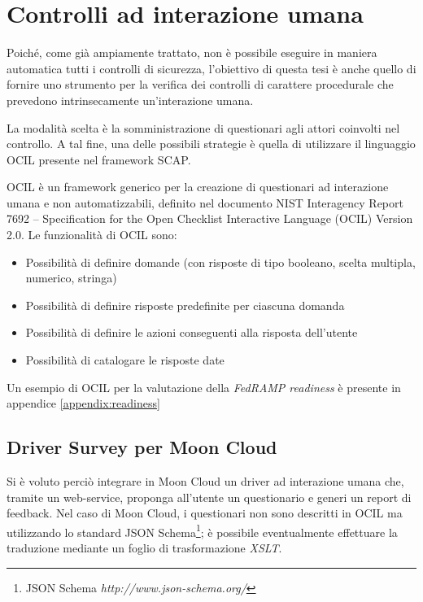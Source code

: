 \documentclass[../main.tex]{subfiles}
\begin{document}
\section{Controlli ad interazione umana}
Poiché, come già ampiamente trattato, non è possibile eseguire in maniera automatica tutti i controlli di sicurezza, l'obiettivo di questa tesi è
anche quello di fornire uno strumento per la verifica dei controlli di carattere procedurale che prevedono intrinsecamente un'interazione umana.

La modalità scelta è la somministrazione di questionari agli attori coinvolti nel controllo. A tal fine, una delle possibili strategie è quella di utilizzare
il linguaggio OCIL presente nel framework SCAP.

OCIL è un framework generico per la creazione di questionari ad interazione umana e non automatizzabili, definito nel documento NIST Interagency Report 7692 – Specification for the Open Checklist Interactive Language (OCIL) Version 2.0.
Le funzionalità di OCIL sono:
\begin{itemize}
    \item Possibilità di definire domande (con risposte di tipo booleano, scelta multipla, numerico, stringa)
    \item Possibilità di definire risposte predefinite per ciascuna domanda
    \item Possibilità di definire le azioni conseguenti alla risposta dell'utente 
    \item Possibilità di catalogare le risposte date
\end{itemize}
Un esempio di OCIL per la valutazione della \textit{FedRAMP readiness} è presente in appendice \ref{appendix:readiness}

\subsection{Driver Survey per Moon Cloud}

Si è voluto perciò integrare in Moon Cloud un driver ad interazione umana che, tramite un web-service, proponga all'utente un questionario e generi un report di feedback.
Nel caso di Moon Cloud, i questionari non sono descritti in OCIL ma utilizzando lo standard JSON Schema\footnote{JSON Schema \textit{http://www.json-schema.org/}}; è possibile eventualmente effettuare la traduzione mediante un foglio di trasformazione \textit{XSLT}.
\end{document}
